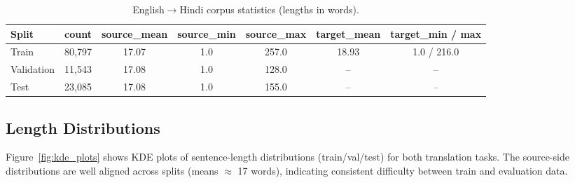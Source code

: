 \documentclass[11pt, oneside]{article}   	%
\begin{document}
\begin{table}[h]
\centering
\caption{English$\rightarrow$Hindi corpus statistics (lengths in words).}
\label{tab:hindi_stats}
\begin{tabular}{|l|c|c|c|c|c|c|}
\hline
\textbf{Split} & \textbf{count} & \textbf{source\_mean} & \textbf{source\_min} & \textbf{source\_max} & \textbf{target\_mean} & \textbf{target\_min / max} \\
\hline
Train       & 80{,}797 & 17.07 & 1.0 & 257.0 & 18.93 & 1.0 / 216.0 \\
Validation  & 11{,}543 & 17.08 & 1.0 & 128.0 & --    & -- \\
Test        & 23{,}085 & 17.08 & 1.0 & 155.0 & --    & -- \\
\hline
\end{tabular}
\end{table}

\subsection{Length Distributions}
Figure~\ref{fig:kde_plots} shows KDE plots of sentence-length distributions (train/val/test) for both translation tasks. The source-side distributions are well aligned across splits (means $\approx$ 17 words), indicating consistent difficulty between train and evaluation data.
\end{document}
